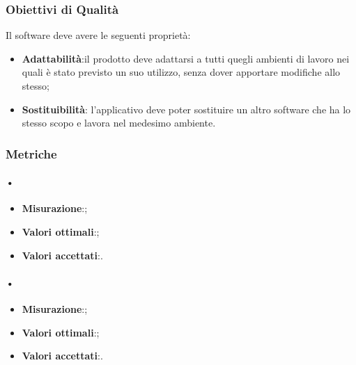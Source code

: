 \subsubsection{Obiettivi di Qualità}
Il software deve avere le seguenti proprietà:
\begin{itemize}
\item \textbf{Adattabilità}:il prodotto deve adattarsi a tutti quegli ambienti di lavoro nei quali è stato previsto un suo utilizzo, senza dover apportare modifiche allo stesso;
\item \textbf{Sostituibilità}: l'applicativo deve poter sostituire un altro software che ha lo stesso scopo e lavora nel medesimo ambiente.
\end{itemize}	

\subsubsection{Metriche}

\paragraph{•}
\begin{itemize}
\item \textbf{Misurazione}:;
\item \textbf{Valori ottimali}:;
\item \textbf{Valori accettati}:.
\end{itemize}

\paragraph{•}
\begin{itemize}
\item \textbf{Misurazione}:;
\item \textbf{Valori ottimali}:;
\item \textbf{Valori accettati}:.
\end{itemize}